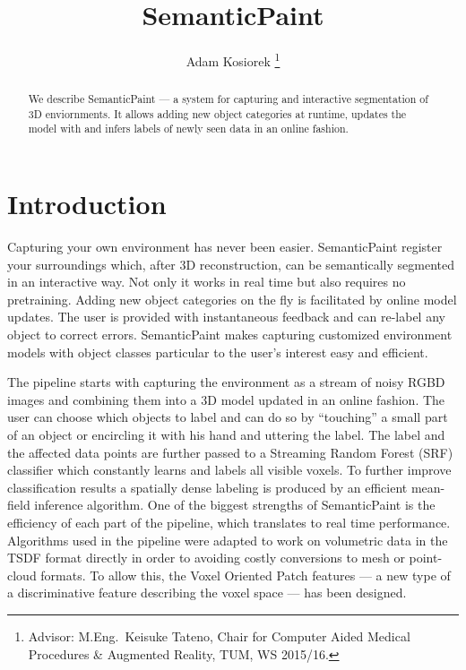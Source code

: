 \documentclass{llncs}
\begin{document}
	\title{SemanticPaint}
	\author{Adam Kosiorek
	\thanks{Advisor: M.Eng.~Keisuke Tateno, Chair for Computer Aided Medical Procedures \& Augmented Reality, TUM, WS 2015/16.}}
	\institute{}
	\maketitle

\begin{abstract}
  We describe SemanticPaint \cite{SemanticPaint} --- a system for capturing and  interactive segmentation of 3D enviornments. It allows adding new object categories at runtime, updates the model with and infers labels of newly seen data in an online fashion. 
\end{abstract}

\section{Introduction}
  
  Capturing your own environment has never been easier. SemanticPaint \cite{SemanticPaint} register your surroundings which, after 3D reconstruction, can be semantically segmented in an interactive way. Not only it works in real time but also requires no pretraining. Adding new object categories on the fly is facilitated by online model updates. The user is provided with instantaneous feedback and can re-label any object to correct errors. SemanticPaint makes capturing customized environment models with object classes particular to the user's interest easy and efficient.  
  
  The pipeline starts with capturing the environment as a stream of noisy RGBD images and combining them into a  3D model updated in an online fashion. The user can choose which objects to label and can do so by ``touching'' a small part of an object or encircling it with his hand and uttering the label. The label and the affected data points are further passed to a Streaming Random Forest (SRF) classifier which constantly learns and labels all visible voxels. To further improve classification results a spatially dense labeling is produced by an efficient mean-field inference algorithm. One of the biggest strengths of SemanticPaint is the efficiency of each part of the pipeline, which translates to real time performance. Algorithms used in the pipeline were adapted to work on volumetric data in the TSDF format directly in order to avoiding costly conversions to mesh or point-cloud formats. To allow this, the Voxel Oriented Patch features --- a new type of a discriminative feature describing the voxel space --- has been designed. 
 
\end{document}

